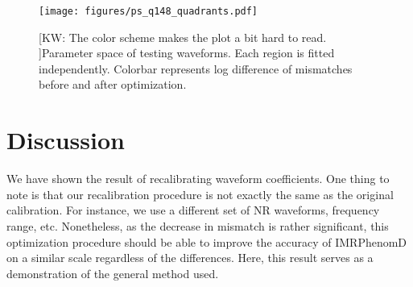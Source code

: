 \documentclass[twocolumn]{aastex631}
\newcommand{\kw}[1]{{\color{rb4}[KW: #1 ]}}
\begin{document}
\begin{figure}[t]
	\centering
	\texttt{[image: figures/ps\_q148\_quadrants.pdf]}
	\caption{\kw{The color scheme makes the plot a bit hard to read.}Parameter
	space of testing waveforms. Each region is fitted independently. Colorbar
	represents log difference of mismatches before and after optimization.}
	\label{fig:ps_q148_quadrant}
\end{figure}

\section{Discussion} \label{sec:discussion}


We have shown the result of recalibrating waveform coefficients. One thing to
note is that our recalibration procedure is not exactly the same as the original
calibration. For instance, we use a different set of NR waveforms, frequency
range, etc. Nonetheless, as the decrease in mismatch is rather significant, this
optimization procedure should be able to improve the accuracy of IMRPhenomD on a
similar scale regardless of the differences. Here, this result serves as a
demonstration of the general method used.  
\end{document}
